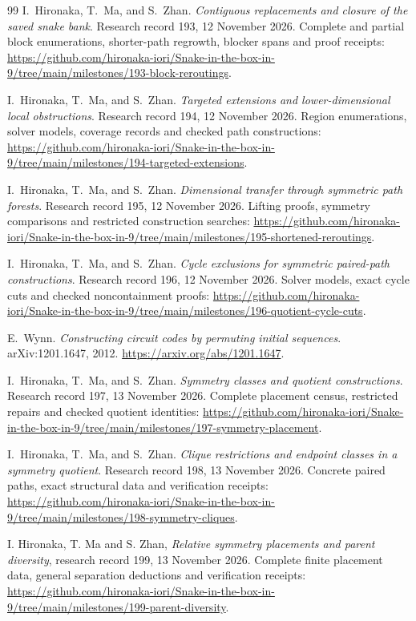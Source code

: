 \documentclass[11pt,a4paper]{article}
\theoremstyle{definition}
\theoremstyle{remark}
\begin{document}
\begin{thebibliography}{99}
I.~Hironaka, T.~Ma, and S.~Zhan. \emph{Contiguous replacements and closure of the saved snake bank}. Research record 193, 12 November 2026. Complete and partial block enumerations, shorter-path regrowth, blocker spans and proof receipts:
\url{https://github.com/hironaka-iori/Snake-in-the-box-in-9/tree/main/milestones/193-block-reroutings}.

I.~Hironaka, T.~Ma, and S.~Zhan. \emph{Targeted extensions and lower-dimensional local obstructions}. Research record 194, 12 November 2026. Region enumerations, solver models, coverage records and checked path constructions:
\url{https://github.com/hironaka-iori/Snake-in-the-box-in-9/tree/main/milestones/194-targeted-extensions}.

I.~Hironaka, T.~Ma, and S.~Zhan. \emph{Dimensional transfer through symmetric path forests}. Research record 195, 12 November 2026. Lifting proofs, symmetry comparisons and restricted construction searches:
\url{https://github.com/hironaka-iori/Snake-in-the-box-in-9/tree/main/milestones/195-shortened-reroutings}.

I.~Hironaka, T.~Ma, and S.~Zhan. \emph{Cycle exclusions for symmetric paired-path constructions}. Research record 196, 12 November 2026. Solver models, exact cycle cuts and checked noncontainment proofs:
\url{https://github.com/hironaka-iori/Snake-in-the-box-in-9/tree/main/milestones/196-quotient-cycle-cuts}.

E.~Wynn. \emph{Constructing circuit codes by permuting initial sequences}.
arXiv:1201.1647, 2012. \url{https://arxiv.org/abs/1201.1647}.

I.~Hironaka, T.~Ma, and S.~Zhan. \emph{Symmetry classes and quotient constructions}.
Research record 197, 13 November 2026. Complete placement census,
restricted repairs and checked quotient identities:
\url{https://github.com/hironaka-iori/Snake-in-the-box-in-9/tree/main/milestones/197-symmetry-placement}.

I.~Hironaka, T.~Ma, and S.~Zhan. \emph{Clique restrictions and endpoint classes in a symmetry quotient}.
Research record 198, 13 November 2026. Concrete paired paths, exact structural data and verification receipts:
\url{https://github.com/hironaka-iori/Snake-in-the-box-in-9/tree/main/milestones/198-symmetry-cliques}.


I. Hironaka, T. Ma and S. Zhan,
\emph{Relative symmetry placements and parent diversity},
research record 199, 13 November 2026. Complete finite placement data,
general separation deductions and verification receipts:
\url{https://github.com/hironaka-iori/Snake-in-the-box-in-9/tree/main/milestones/199-parent-diversity}.



\end{thebibliography}
\end{document}
